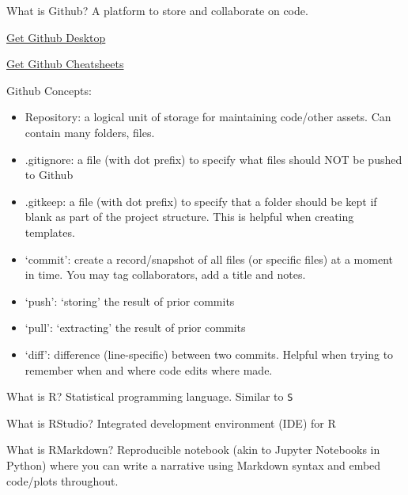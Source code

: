 \documentclass[
  ignorenonframetext,
]{beamer}
\providecommand{\tightlist}{%
  \setlength{\itemsep}{0pt}\setlength{\parskip}{0pt}}
\begin{document}
\begin{frame}{What is Github?}
\protect\hypertarget{what-is-github}{}
A platform to store and collaborate on code.

\href{https://desktop.github.com/}{Get Github Desktop}

\href{https://training.github.com/downloads/github-git-cheat-sheet/}{Get
Github Cheatsheets}
\end{frame}

\begin{frame}{Github Concepts:}
\protect\hypertarget{github-concepts}{}
\begin{itemize}
\tightlist
\item
  Repository: a logical unit of storage for maintaining code/other
  assets. Can contain many folders, files.
\item
  .gitignore: a file (with dot prefix) to specify what files should NOT
  be pushed to Github
\item
  .gitkeep: a file (with dot prefix) to specify that a folder should be
  kept if blank as part of the project structure. This is helpful when
  creating templates.
\item
  `commit': create a record/snapshot of all files (or specific files) at
  a moment in time. You may tag collaborators, add a title and notes.
\item
  `push': `storing' the result of prior commits
\item
  `pull': `extracting' the result of prior commits
\item
  `diff': difference (line-specific) between two commits. Helpful when
  trying to remember when and where code edits where made.
\end{itemize}
\end{frame}

\begin{frame}[fragile]{What is R?}
\protect\hypertarget{what-is-r}{}
Statistical programming language. Similar to \texttt{S}

\begin{block}{What is RStudio?}
\protect\hypertarget{what-is-rstudio}{}
Integrated development environment (IDE) for R
\end{block}

\begin{block}{What is RMarkdown?}
\protect\hypertarget{what-is-rmarkdown}{}
Reproducible notebook (akin to Jupyter Notebooks in Python) where you
can write a narrative using Markdown syntax and embed code/plots
throughout.
\end{block}
\end{frame}
\end{document}
